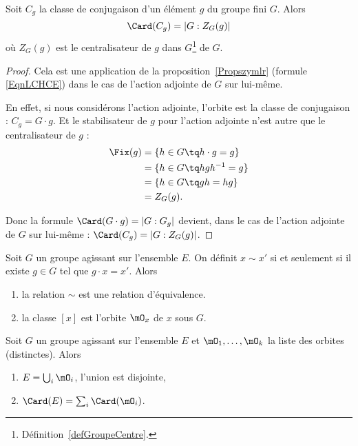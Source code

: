 \begin{corollary}       \label{CORooRRVHooTyCjZZ}
    Soit \( C_g\) la classe de conjugaison d'un élément  \( g\) du groupe fini \( G\). Alors
    \begin{equation}
        \Card(C_g)=| G:Z_G(g) |
    \end{equation}
    où $Z_G(g)$ est le centralisateur de \( g\) dans \( G\)\footnote{Définition~\ref{defGroupeCentre}.} de \( G\).
\end{corollary}

\begin{proof}
    Cela est une application de la proposition~\ref{Propszymlr} (formule \eqref{EqnLCHCE}) dans le cas de l'action adjointe de \( G\) sur lui-même.

    En effet, si nous considérons l'action adjointe, l'orbite est la classe de conjugaison : \( C_g=G\cdot g\). Et le stabilisateur de \( g\) pour l'action adjointe n'est autre que le centralisateur de \( g\) :
    \begin{subequations}
        \begin{align}
        \Fix(g)&=\{ h\in G\tq h\cdot g=g \}\\
        &= \{ h\in G\tq hgh^{-1}=g \}\\
        &=\{ h\in G\tq gh=hg \}\\
        &=Z_G(g).
        \end{align}
    \end{subequations}

    Donc la formule \( \Card(G\cdot g)=| G:G_g |\) devient, dans le cas de l'action adjointe de \( G\) sur lui-même : \( \Card(C_g)=| G:Z_G(g) |\).
\end{proof}

\begin{lemma}
    Soit \( G\) un groupe agissant sur l'ensemble \( E\). On définit \( x\sim x'\) si et seulement si il existe \( g\in G\) tel que \( g\cdot x=x'\). Alors
    \begin{enumerate}
        \item
            la relation \( \sim\) est une relation d'équivalence.
        \item
            la classe \( [x]\) est l'orbite \( \mO_x\) de \( x\) sous \( G\).
    \end{enumerate}
\end{lemma}

\begin{corollary} \label{CorARFVMP}
    Soit \( G\) un groupe agissant sur l'ensemble \( E\) et \( \mO_1,\ldots, \mO_k  \) la liste des orbites (distinctes). Alors
    \begin{enumerate}
        \item
            \( E=\bigcup_i\mO_i\), l'union est disjointe,
        \item
            \( \Card(E)=\sum_i\Card(\mO_i)\).
    \end{enumerate}
\end{corollary}

